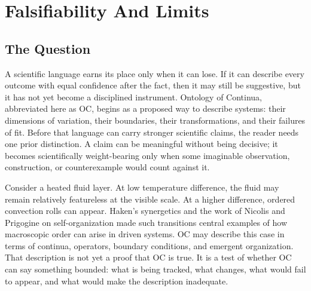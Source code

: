 \documentclass[11pt,a4paper,openany]{book}
\begin{document}
\section{Falsifiability And Limits}
\subsection{The Question}
A scientific language earns its place only when it can lose. If it can describe every outcome with equal confidence after the fact, then it may still be suggestive, but it has not yet become a disciplined instrument. Ontology of Continua, abbreviated here as OC, begins as a proposed way to describe systems: their dimensions of variation, their boundaries, their transformations, and their failures of fit. Before that language can carry stronger scientific claims, the reader needs one prior distinction. A claim can be meaningful without being decisive; it becomes scientifically weight-bearing only when some imaginable observation, construction, or counterexample would count against it. \cite{haken_synergetics,nicolis_prigogine_selforg}\par
Consider a heated fluid layer. At low temperature difference, the fluid may remain relatively featureless at the visible scale. At a higher difference, ordered convection rolls can appear. Haken's synergetics and the work of Nicolis and Prigogine on self-organization made such transitions central examples of how macroscopic order can arise in driven systems. OC may describe this case in terms of continua, operators, boundary conditions, and emergent organization. That description is not yet a proof that OC is true. It is a test of whether OC can say something bounded: what is being tracked, what changes, what would fail to appear, and what would make the description inadequate.\par
\end{document}
